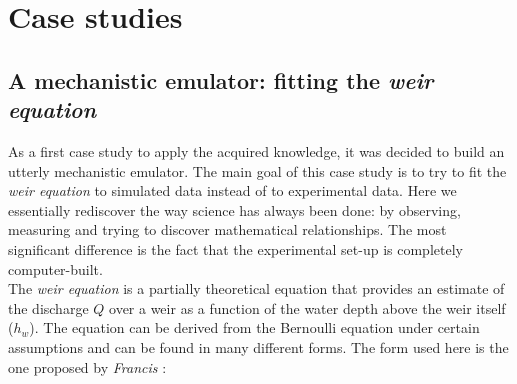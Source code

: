 \chapter{Case studies}
\label{chp:case_studies}

\section{A mechanistic emulator: fitting the \emph{weir equation}}
\label{sec:mechanistic_emulator}


As a first case study to apply the acquired knowledge, it was decided to build an utterly mechanistic emulator.
The main goal of this case study is to try to fit the \emph{weir equation} to simulated data instead of to experimental data.
Here we essentially rediscover the way science has always been done: by observing, measuring and trying to discover mathematical relationships.
The most significant difference is the fact that the experimental set-up is completely computer-built.\\

The \emph{weir equation} is a partially theoretical equation that provides an estimate of the discharge $Q$ over a weir as a function of the water depth above the weir itself ($h_w$).
The equation can be derived from the Bernoulli equation under certain assumptions \autocite{bos_discharge_1989} and can be found in many different forms.
The form used here is the one proposed by \emph{Francis} \autocite{walcott_weir_1907}:

